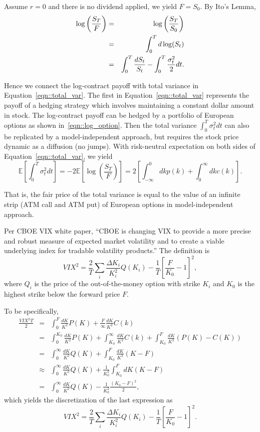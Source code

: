 \documentclass[11pt,reqno,final]{amsart}
\begin{document}
Assume $r=0$ and there is no dividend applied, we yield $F=S_0$. By Ito's Lemma,
\begin{eqnarray}
  \log\left(\frac{S_T}{F}\right) &=& \log\left(\frac{S_T}{S_0}\right) \notag \\
     &=& \int_0^T d \log(S_t) \notag \\
     &=& \int_0^T \frac{d S_t}{S_t} - \int_0^T \frac{\sigma_t^2}{2} dt. \label{eqn::total_var}
\end{eqnarray}

Hence we connect the log-contract payoff with total variance in Equation~\ref{eqn::total_var}. The first in Equation~\ref{eqn::total_var} represents the payoff of a hedging strategy which involves maintaining a constant dollar amount in stock. The log-contract payoff can be hedged by a portfolio of European options as shown in~\ref{eqn::log_option}. Then the total variance $\int_0^T \sigma_t^2 dt$ can also be replicated by a model-independent approach, but requires the stock price dynamic as a diffusion (no jumps). With risk-neutral expectation on both sides of Equation~\ref{eqn::total_var}, we yield
$$
\mathbb{E}\left[\int_0^T \sigma_t^2 dt \right] = -2\mathbb{E}\left[ \log\left(\frac{S_T}{F}\right)\right] = 2\left[\int_{-\infty}^0 dk p(k) + \int_{0}^{\infty} dk c(k) \right].
$$

That is, the fair price of the total variance is equal to the value of an infinite strip (ATM call and ATM put) of European options in model-independent approach.

Per CBOE VIX white paper, ``CBOE is changing VIX to provide a more precise and robust measure of expected market volatility and to create a viable underlying index for tradable volatility products.'' The definition is
\begin{equation}
VIX^2 = \frac{2}{T} \sum_i \frac{\Delta K_i}{K_i^2} Q(K_i) - \frac{1}{T} \left[\frac{F}{K_0} -1\right]^2, \label{eqn::vix_def}
\end{equation}
where $Q_i$ is the price of the out-of-the-money option with strike $K_i$ and $K_0$ is the highest strike below the forward price $F$.

To be specifically,
\begin{eqnarray*}
  \frac{VIX^2 T}{2} &=& \int_0^F \frac{dK}{K^2}P(K) + \frac{F}{\infty} \frac{dK}{K^2}C(k) \\
   &=& \int_0^{K_0} \frac{dK}{K^2}P(K)+ \int_{K_0}^{\infty}\frac{dK}{K^2}C(k) +\int_{K_0}^F \frac{dK}{K^2} (P(K)-C(K))  \\
   &=& \int_0^{\infty} \frac{dK}{K^2} Q(K) + \int_{K_0}^{F} \frac{dK}{K^2} (K-F) \\
   &\approx&  \int_0^{\infty} \frac{dK}{K^2} Q(K) + \frac{1}{K_0^2} \int_{K_0}^F dK(K-F) \\
   &=& \int_0^{\infty} \frac{dK}{K^2} Q(K) - \frac{1}{K_0^2} \frac{(K_0-F)^2}{2},
\end{eqnarray*}
which yields the discretization of the last expression as
$$
VIX^2 = \frac{2}{T} \sum_i \frac{\Delta K_i}{K_i^2} Q(K_i) - \frac{1}{T} \left[\frac{F}{K_0} -1\right]^2.
$$
\end{document}
